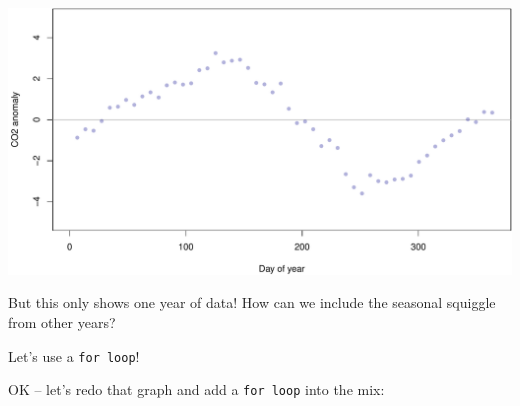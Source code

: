 \documentclass[
]{book}
\newenvironment{Shaded}{\begin{snugshade}}{\end{snugshade}}
\newcommand{\AttributeTok}[1]{\textcolor[rgb]{0.77,0.63,0.00}{#1}}
\newcommand{\CommentTok}[1]{\textcolor[rgb]{0.56,0.35,0.01}{\textit{#1}}}
\newcommand{\DecValTok}[1]{\textcolor[rgb]{0.00,0.00,0.81}{#1}}
\newcommand{\FunctionTok}[1]{\textcolor[rgb]{0.00,0.00,0.00}{#1}}
\newcommand{\NormalTok}[1]{#1}
\newcommand{\SpecialCharTok}[1]{\textcolor[rgb]{0.00,0.00,0.00}{#1}}
\newcommand{\StringTok}[1]{\textcolor[rgb]{0.31,0.60,0.02}{#1}}
\begin{document}
\begin{Shaded}
\end{Shaded}

\includegraphics{figures/unnamed-chunk-315-1.pdf}

But this only shows one year of data! How can we include the seasonal squiggle from other years?

Let's use a \texttt{for\ loop}!

OK -- let's redo that graph and add a \texttt{for\ loop} into the mix:
\end{document}
